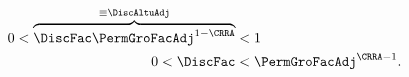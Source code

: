   \begin{equation}\label{eq:FVAC}
    \begin{split}
      0 < \overbrace{\DiscFac \PermGroFacAdj^{1-\CRRA} }^{\equiv \DiscAltuAdj}  & < 1
      \\ 0 < \DiscFac  & < \PermGroFacAdj^{\CRRA-1} .
    \end{split}
  \end{equation}
